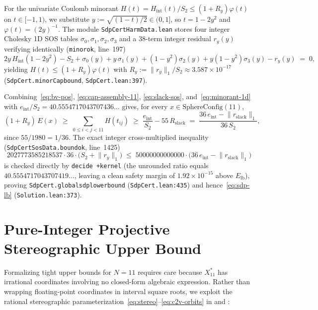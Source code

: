 \documentclass[11pt,reqno]{amsart}
\renewcommand{\_}{\origunderscore\allowbreak}
\theoremstyle{definition}
\newcommand{\norm}[1]{\lVert #1 \rVert}
\newcommand{\Xstar}{X^*_{11}}
\newcommand{\Elb}{E_{\mathrm{lb}}}
\begin{document}
For the univariate Coulomb minorant $H(t) = H_{\mathrm{int}}(t)/S_2 \le (1 + R_y)\varphi(t)$ on $t \in [-1,1)$, we substitute $y := \sqrt{(1-t)/2} \in (0,1]$, so $t = 1 - 2y^2$ and $\varphi(t) = (2y)^{-1}$.
The module \texttt{SdpCertHarmData.lean} stores four integer Cholesky 1D SOS tables $\sigma_0,\sigma_1,\sigma_2,\sigma_3$ and a $38$-term integer residual $r_y(y)$ verifying identically (\texttt{minor\_ok}, line~197)
\begin{equation}\label{eq:minorant-1d}
  2y\,H_{\mathrm{int}}(1 - 2y^2) - S_2 + \sigma_0(y) + y\,\sigma_1(y) + (1-y^2)\sigma_2(y) + y(1-y^2)\sigma_3(y) - r_y(y) \;=\; 0,
\end{equation}
yielding $H(t) \le (1 + R_y)\varphi(t)$ with $R_y := \norm{r_y}_1 / S_2 \approx 3.587 \times 10^{-17}$ (\texttt{SdpCert.minorCap\_bound}, \texttt{SdpCert.lean:397}).

Combining~\eqref{eq:bv-pos}, \eqref{eq:cap-assembly-11}, \eqref{eq:slack-sos}, and~\eqref{eq:minorant-1d} with $e_{\mathrm{int}}/S_2 = 40.5554717043707436\ldots$ gives, for every $x \in \mathrm{SphereConfig}(11)$,
\[
  (1 + R_y)\,E(x) \;\ge\; \sum_{0 \le i < j < 11} H(t_{ij})
  \;\ge\; \frac{e_{\mathrm{int}}}{S_2} - 55\,R_{\mathrm{slack}}
  \;=\; \frac{36\,e_{\mathrm{int}} - \norm{r_{\mathrm{slack}}}_1}{36\,S_2},
\]
since $55 / 1980 = 1/36$.
The exact integer cross-multiplied inequality (\texttt{SdpCertSosData.bound\_ok}, line~1425)
\[
  2027773585218537 \cdot 36 \cdot \bigl(S_2 + \norm{r_y}_1\bigr)
  \;\le\; 50000000000000 \cdot \bigl(36\,e_{\mathrm{int}} - \norm{r_{\mathrm{slack}}}_1\bigr)
\]
is checked directly by \texttt{decide +kernel} (the unrounded ratio equals $40.5554717043707419\ldots$, leaving a clean safety margin of $1.92 \times 10^{-15}$ above $\Elb$), proving \texttt{SdpCert.global\_sdp\_lower\_bound} (\texttt{SdpCert.lean:435}) and hence~\eqref{eq:sdp-lb} (\texttt{Solution.lean:373}).

\section{Pure-Integer Projective Stereographic Upper Bound}\label{sec:upper}

Formalizing tight upper bounds for $N = 11$ requires care because $\Xstar$ has irrational coordinates involving no closed-form algebraic expression.
Rather than wrapping floating-point coordinates in interval square roots, we exploit the rational stereographic parameterization~\eqref{eq:stereo}--\eqref{eq:c2v-orbits} in  and :
\end{document}
